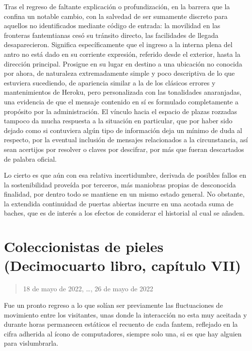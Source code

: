 \documentclass[
]{book}
\begin{document}
Tras el regreso de faltante explicación o profundización, en la barrera que la confina un notable cambio, con la salvedad de ser sumamente discreto para aquellos no identificados mediante código de entrada: la movilidad en las fronteras fantemtianas cesó su tránsito directo, las facilidades de llegada desaparecieron. Significa específicamente que el ingreso a la interna plena del antro no está dado en su corriente expresión, referido desde el exterior, hasta la dirección principal. Prosigue en su lugar en destino a una ubicación no conocida por ahora, de naturaleza extremadamente simple y poco descriptiva de lo que estuviera sucediendo, de apariencia similar a la de los clásicos errores y mantenimientos de Heroku, pero personalizada con las tonalidades anaranjadas, una evidencia de que el mensaje contenido en sí es formulado completamente a propósito por la administración. El vínculo hacia el espacio de plazas rozzadas tampoco da mucha respuesta a la situación en particular, que por haber sido dejado como si contuviera algún tipo de información deja un mínimo de duda al respecto, por la eventual inclusión de mensajes relacionados a la circunstancia, así sean acertijos por resolver o claves por descifrar, por más que fueran descartados de palabra oficial.

Lo cierto es que aún con esa relativa incertidumbre, derivada de posibles fallos en la sostenibilidad proveída por terceros, más maniobras propias de desconocida finalidad, por dentro todo se mantiene en un mismo estado general. No obstante, la extendida continuidad de puertas abiertas incurre en una acotada suma de baches, que es de interés a los efectos de considerar el historial al cual se añaden.

\hypertarget{coleccionistas-de-pieles-decimocuarto-libro-capuxedtulo-vii}{%
\section{Coleccionistas de pieles (Decimocuarto libro, capítulo VII)}\label{coleccionistas-de-pieles-decimocuarto-libro-capuxedtulo-vii}}

\begin{quote}
18 de mayo de 2022, \ldots, 26 de mayo de 2022
\end{quote}

Fue un pronto regreso a lo que solían ser previamente las fluctuaciones de movimiento entre los visitantes, unas donde la interacción no esta muy aceitada y durante horas permanecen estáticos el recuento de cada fantem, reflejado en la cifra adherida al ícono de computadores, siempre solo una, si es que hay alguien para vislumbrarla.
\end{document}
